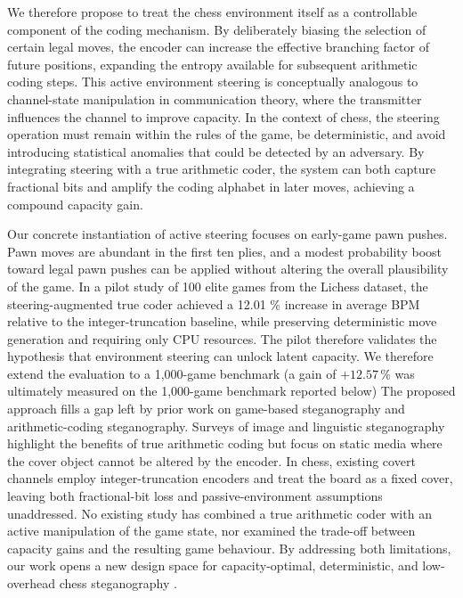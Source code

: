 \documentclass[journal]{IEEEtran}
\begin{document}
We therefore propose to treat the chess environment itself as a controllable component of the coding mechanism. By deliberately biasing the selection of certain legal moves, the encoder can increase the effective branching factor of future positions, expanding the entropy available for subsequent arithmetic coding steps. This active environment steering is conceptually analogous to channel-state manipulation in communication theory, where the transmitter influences the channel to improve capacity. In the context of chess, the steering operation must remain within the rules of the game, be deterministic, and avoid introducing statistical anomalies that could be detected by an adversary. By integrating steering with a true arithmetic coder, the system can both capture fractional bits and amplify the coding alphabet in later moves, achieving a compound capacity gain.

Our concrete instantiation of active steering focuses on early-game pawn pushes. Pawn moves are abundant in the first ten plies, and a modest probability boost toward legal pawn pushes can be applied without altering the overall plausibility of the game. In a pilot study of 100 elite games from the Lichess dataset, the steering-augmented true coder achieved a 12.01 \% increase in average BPM relative to the integer-truncation baseline, while preserving deterministic move generation and requiring only CPU resources. The pilot therefore validates the hypothesis that environment steering can unlock latent capacity. We therefore extend the evaluation to a 1,000-game benchmark (a gain of $+12.57\,\%$ was ultimately measured on the 1,000-game benchmark reported below) The proposed approach fills a gap left by prior work on game-based steganography and arithmetic-coding steganography. Surveys of image and linguistic steganography highlight the benefits of true arithmetic coding but focus on static media where the cover object cannot be altered by the encoder. In chess, existing covert channels employ integer-truncation encoders and treat the board as a fixed cover, leaving both fractional-bit loss and passive-environment assumptions unaddressed. No existing study has combined a true arithmetic coder with an active manipulation of the game state, nor examined the trade-off between capacity gains and the resulting game behaviour. By addressing both limitations, our work opens a new design space for capacity-optimal, deterministic, and low-overhead chess steganography \cite{setiadi2025poweredstegano, yan2026comprehensives, ruoss2024amortizedplann, driss2025steganographyi}.
\end{document}
